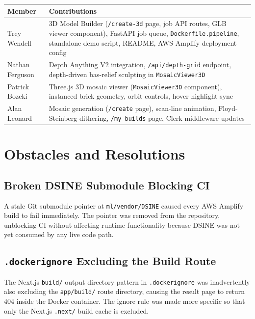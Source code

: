 \documentclass[12pt]{article}
\begin{document}
\begin{center}
\begin{tabular}{lp{9cm}}
\toprule
\textbf{Member} & \textbf{Contributions} \\
\midrule
Trey Wendell &
    3D Model Builder (\texttt{/create-3d} page, job API routes, GLB viewer
    component), FastAPI job queue, \texttt{Dockerfile.pipeline},
    standalone demo script, README, AWS Amplify deployment config \\[0.5em]
Nathan Ferguson &
    Depth Anything V2 integration, \texttt{/api/depth-grid} endpoint,
    depth-driven bas-relief sculpting in \texttt{MosaicViewer3D} \\[0.5em]
Patrick Bozeki &
    Three.js 3D mosaic viewer (\texttt{MosaicViewer3D} component),
    instanced brick geometry, orbit controls, hover highlight sync \\[0.5em]
Alan Leonard &
    Mosaic generation (\texttt{/create} page), scan-line animation,
    Floyd-Steinberg dithering, \texttt{/my-builds} page, Clerk
    middleware updates \\
\bottomrule
\end{tabular}
\end{center}

\section{Obstacles and Resolutions}

\subsection{Broken DSINE Submodule Blocking CI}

A stale Git submodule pointer at \texttt{ml/vendor/DSINE} caused every AWS
Amplify build to fail immediately. The pointer was removed from the repository,
unblocking CI without affecting runtime functionality because DSINE was not yet
consumed by any live code path.

\subsection{\texttt{.dockerignore} Excluding the Build Route}

The Next.js \texttt{build/} output directory pattern in
\texttt{.dockerignore} was inadvertently also excluding the
\texttt{app/build/} route directory, causing the result page to return 404
inside the Docker container. The ignore rule was made more specific so that
only the Next.js \texttt{.next/} build cache is excluded.
\end{document}

